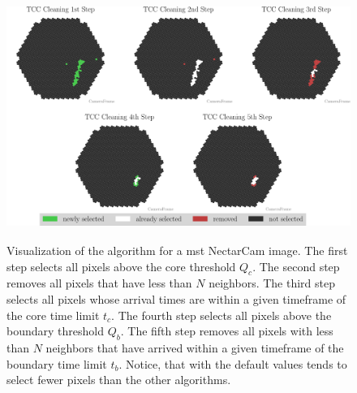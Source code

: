 \begin{figure}
    \centering
    \includegraphics[height=8cm]{plots/cleaner_steps/tcc.pdf}
    \caption{Visualization of the \tcc{} algorithm for a \gls{mst} NectarCam image. The first step
    selects all pixels above the core threshold \(Q_c\). The second step removes all pixels that have less than
    \(N\) neighbors. The third step selects all pixels whose arrival times are within a given timeframe of the
    core time limit \(t_c\). The fourth step selects all pixels above the boundary threshold \(Q_b\).
    The fifth step removes all pixels with less than \(N\) neighbors that have arrived within a given timeframe
    of the boundary time limit \(t_b\). Notice, that with the default values \tcc{} tends to select fewer pixels
    than the other algorithms.}%
    \label{fig:tcc_cleaning}
\end{figure}
\vspace{-0.5cm}

